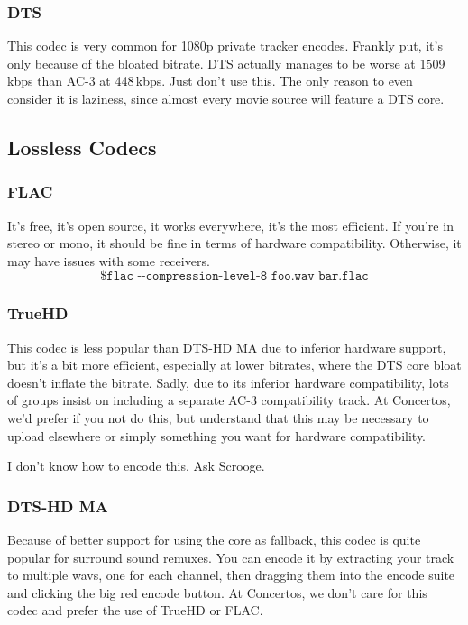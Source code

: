 \documentclass{scrartcl}
\begin{document}
\subsubsection{DTS}

This codec is very common for 1080p private tracker encodes.  Frankly put, it's only because of the bloated bitrate.  DTS actually manages to be worse at 1509\,kbps than AC-3 at 448\,kbps.  Just don't use this.  The only reason to even consider it is laziness, since almost every movie source will feature a DTS core.

\subsection{Lossless Codecs}

\subsubsection{FLAC}

It's free, it's open source, it works everywhere, it's the most efficient.  If you're in stereo or mono, it should be fine in terms of hardware compatibility.  Otherwise, it may have issues with some receivers.
\[
\texttt{\$ flac -{}-compression-level-8 foo.wav bar.flac}
\]

\subsubsection{TrueHD}


This codec is less popular than DTS-HD MA due to inferior hardware support, but it's a bit more efficient, especially at lower bitrates, where the DTS core bloat doesn't inflate the bitrate.  Sadly, due to its inferior hardware compatibility, lots of groups insist on including a separate AC-3 compatibility track.  At Concertos, we'd prefer if you not do this, but understand that this may be necessary to upload elsewhere or simply something you want for hardware compatibility.

I don't know how to encode this.  Ask Scrooge.

\subsubsection{DTS-HD MA}

Because of better support for using the core as fallback, this codec is quite popular for surround sound remuxes.  You can encode it by extracting your track to multiple wavs, one for each channel, then dragging them into the encode suite and clicking the big red encode button.  At Concertos, we don't care for this codec and prefer the use of TrueHD or FLAC.
\end{document}
